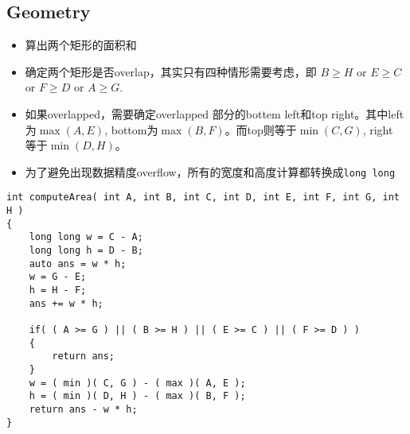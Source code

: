 \subsection{Geometry}
\begin{itemize}
\item 算出两个矩形的面积和
\item 确定两个矩形是否overlap，其实只有四种情形需要考虑，即 $B\geq H$ or $E\geq C$ or $F\geq D$ or $A\geq G$.
\item 如果overlapped，需要确定overlapped 部分的bottem left和top right。其中left为$\max(A,E)$, bottom为$\max(B, F)$。而top则等于$\min(C,G)$, right
等于$\min(D,H)$。
\item 为了避免出现数据精度overflow，所有的宽度和高度计算都转换成\texttt{long long}
\end{itemize}

\setcounter{lstlisting}{0}
\begin{lstlisting}[style=customc, caption={Geometry}]
int computeArea( int A, int B, int C, int D, int E, int F, int G, int H )
{
    long long w = C - A;
    long long h = D - B;
    auto ans = w * h;
    w = G - E;
    h = H - F;
    ans += w * h;

    if( ( A >= G ) || ( B >= H ) || ( E >= C ) || ( F >= D ) )
    {
        return ans;
    }
    w = ( min )( C, G ) - ( max )( A, E );
    h = ( min )( D, H ) - ( max )( B, F );
    return ans - w * h;
}
\end{lstlisting}